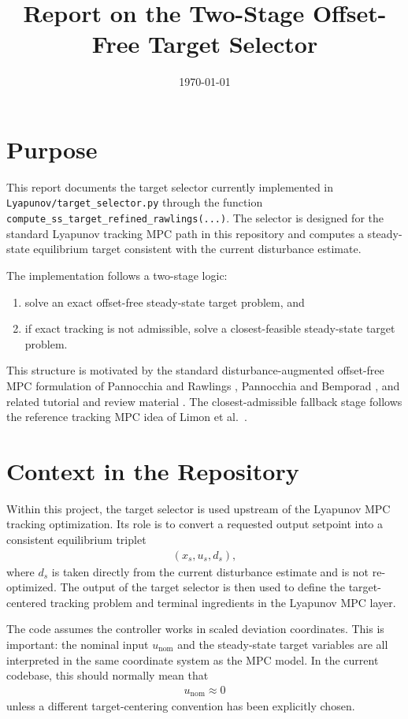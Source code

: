 \documentclass[11pt]{article}
\title{Report on the Two-Stage Offset-Free Target Selector}
\author{}
\date{\today}
\newcommand{\xs}{x_s}
\newcommand{\us}{u_s}
\newcommand{\ds}{d_s}
\begin{document}
\maketitle

\section{Purpose}
This report documents the target selector currently implemented in
\texttt{Lyapunov/target\_selector.py} through the function
\texttt{compute\_ss\_target\_refined\_rawlings(...)}. The selector is designed
for the standard Lyapunov tracking MPC path in this repository and computes a
steady-state equilibrium target consistent with the current disturbance estimate.

The implementation follows a two-stage logic:
\begin{enumerate}[label=\arabic*.]
    \item solve an exact offset-free steady-state target problem, and
    \item if exact tracking is not admissible, solve a closest-feasible
    steady-state target problem.
\end{enumerate}

This structure is motivated by the standard disturbance-augmented offset-free MPC
formulation of Pannocchia and Rawlings \cite{PannocchiaRawlings2003},
Pannocchia and Bemporad \cite{PannocchiaBemporad2007}, and related tutorial and
review material \cite{MaederMorari2010,PannocchiaECC2015,PannocchiaIFAC2015}.
The closest-admissible fallback stage follows the reference tracking MPC idea of
Limon et al.\ \cite{Limon2008}.

\section{Context in the Repository}
Within this project, the target selector is used upstream of the Lyapunov MPC
tracking optimization. Its role is to convert a requested output setpoint into a
consistent equilibrium triplet
\begin{align}
    (\xs,\us,\ds),
\end{align}
where $\ds$ is taken directly from the current disturbance estimate and is not
re-optimized. The output of the target selector is then used to define the
target-centered tracking problem and terminal ingredients in the Lyapunov MPC
layer.

The code assumes the controller works in scaled deviation coordinates. This is
important: the nominal input $u_{\mathrm{nom}}$ and the steady-state target
variables are all interpreted in the same coordinate system as the MPC model.
In the current codebase, this should normally mean that
\begin{align}
    u_{\mathrm{nom}} \approx 0
\end{align}
unless a different target-centering convention has been explicitly chosen.
\end{document}
